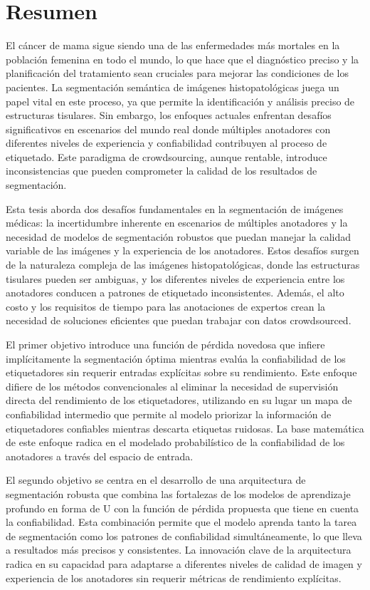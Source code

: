 \cleardoublepage
\chapter*{Resumen}

El cáncer de mama sigue siendo una de las enfermedades más mortales
en la población femenina en todo el mundo, lo que hace que el
diagnóstico preciso y la planificación del tratamiento sean cruciales
para mejorar las condiciones de los pacientes. La segmentación
semántica de imágenes histopatológicas juega un papel vital en este
proceso, ya que permite la identificación y análisis preciso de
estructuras tisulares. Sin embargo, los enfoques actuales enfrentan
desafíos significativos en escenarios del mundo real donde múltiples
anotadores con diferentes niveles de experiencia y confiabilidad
contribuyen al proceso de etiquetado. Este paradigma de
crowdsourcing, aunque rentable, introduce inconsistencias que pueden
comprometer la calidad de los resultados de segmentación.

Esta tesis aborda dos desafíos fundamentales en la segmentación de
imágenes médicas: la incertidumbre inherente en escenarios de
múltiples anotadores y la necesidad de modelos de segmentación
robustos que puedan manejar la calidad variable de las imágenes y la
experiencia de los anotadores. Estos desafíos surgen de la naturaleza
compleja de las imágenes histopatológicas, donde las estructuras
tisulares pueden ser ambiguas, y los diferentes niveles de
experiencia entre los anotadores conducen a patrones de etiquetado
inconsistentes. Además, el alto costo y los requisitos de tiempo para
las anotaciones de expertos crean la necesidad de soluciones
eficientes que puedan trabajar con datos crowdsourced.

El primer objetivo introduce una función de pérdida novedosa que
infiere implícitamente la segmentación óptima mientras evalúa la
confiabilidad de los etiquetadores sin requerir entradas explícitas
sobre su rendimiento. Este enfoque difiere de los métodos
convencionales al eliminar la necesidad de supervisión directa del
rendimiento de los etiquetadores, utilizando en su lugar un mapa de
confiabilidad intermedio que permite al modelo priorizar la
información de etiquetadores confiables mientras descarta etiquetas
ruidosas. La base matemática de este enfoque radica en el modelado
probabilístico de la confiabilidad de los anotadores a través del
espacio de entrada.

El segundo objetivo se centra en el desarrollo de una arquitectura de
segmentación robusta que combina las fortalezas de los modelos de
aprendizaje profundo en forma de U con la función de pérdida
propuesta que tiene en cuenta la confiabilidad. Esta combinación
permite que el modelo aprenda tanto la tarea de segmentación como los
patrones de confiabilidad simultáneamente, lo que lleva a resultados
más precisos y consistentes. La innovación clave de la arquitectura
radica en su capacidad para adaptarse a diferentes niveles de calidad
de imagen y experiencia de los anotadores sin requerir métricas de
rendimiento explícitas.

